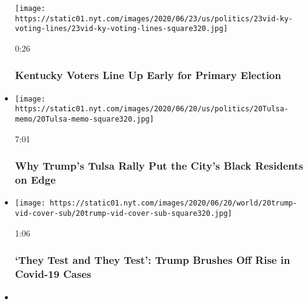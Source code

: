 \begin{itemize}
  \texttt{[image: https://static01.nyt.com/images/2020/06/23/us/politics/23vid-ky-voting-lines/23vid-ky-voting-lines-square320.jpg]}

  0:26

  \hypertarget{kentucky-voters-line-up-early-for-primary-election}{%
  \subsubsection{Kentucky Voters Line Up Early for Primary
  Election}\label{kentucky-voters-line-up-early-for-primary-election}}
\item
  \href{https://www.nytimes.com/video/us/100000007188759/trump-rally-juneteenth-tulsa-oklahoma.html?action=click\&module=video-series-bar\&region=header\&pgtype=Article\&playlistId=video/2020-Elections}{}

  \texttt{[image: https://static01.nyt.com/images/2020/06/20/us/politics/20Tulsa-memo/20Tulsa-memo-square320.jpg]}

  7:01

  \hypertarget{why-trumps-tulsa-rally-put-the-citys-black-residents-on-edge}{%
  \subsubsection{Why Trump's Tulsa Rally Put the City's Black Residents
  on
  Edge}\label{why-trumps-tulsa-rally-put-the-citys-black-residents-on-edge}}
\item
  \href{https://www.nytimes.com/video/us/politics/100000007202285/trump-tulsa-rally-coronavirus.html?action=click\&module=video-series-bar\&region=header\&pgtype=Article\&playlistId=video/2020-Elections}{}

  \texttt{[image: https://static01.nyt.com/images/2020/06/20/world/20trump-vid-cover-sub/20trump-vid-cover-sub-square320.jpg]}

  1:06

  \hypertarget{they-test-and-they-test-trump-brushes-off-rise-in-covid-19-cases}{%
  \subsubsection{`They Test and They Test': Trump Brushes Off Rise in
  Covid-19
  Cases}\label{they-test-and-they-test-trump-brushes-off-rise-in-covid-19-cases}}
\item
  \href{https://www.nytimes.com/video/us/politics/100000007202247/trump-tulsa-rally.html?action=click\&module=video-series-bar\&region=header\&pgtype=Article\&playlistId=video/2020-Elections}{}


\end{itemize}
